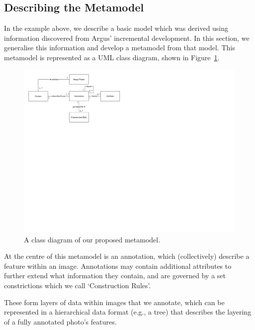 \subsection{Describing the Metamodel}
\label{sec:dataset:architecture:metamodel}


In the example above, we describe a basic model which was derived using information discovered from Argus' incremental development. In this section, we generalise this information and develop a metamodel from that model. This metamodel is represented as a UML class diagram, shown in Figure~\ref{fig:dataset:metamodel_class_diagram}.

\begin{figure}[h]
  \centering
  \includegraphics[width=\textwidth]{images/dataset/metamodel_class_diagram}
  \caption[Class diagram of our proposed metamodel]{A class diagram of our proposed metamodel.}
  \label{fig:dataset:metamodel_class_diagram}
\end{figure}

At the centre of this metamodel is an annotation, which (collectively) describe a feature within an image. Annotations may contain additional attributes to further extend what information they contain, and are governed by a set constrictions which we call `Construction Rules'.

These form layers of data within images that we annotate, which can be represented in a hierarchical data format (e.g., a tree) that describes the layering of a fully annotated photo's features.

